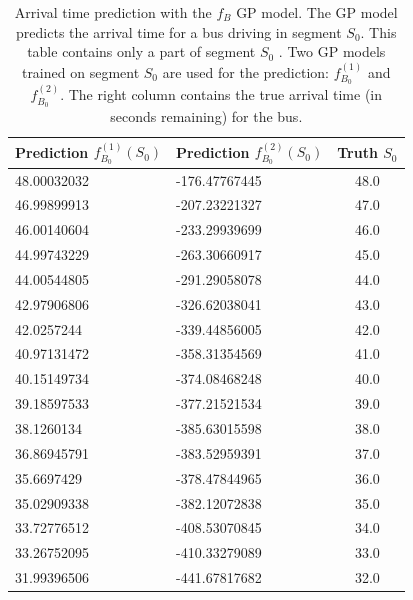 \begin{table}
    \centering
    \caption[Arrival time prediction with the $f_B$ GP model]%
    {{\small Arrival time prediction with the $f_B$ GP model.
    The GP model predicts the arrival time for a bus driving in segment $S_0$.
    This table contains only a part of segment $S_0$ .
    Two GP models trained on segment $S_0$ are used for the prediction: $f^{(1)}_{B_0}$ and $f^{(2)}_{B_0}$.
    The right column contains the true arrival time (in seconds remaining) for the bus.}}
    \label{table:f_B-examples} 
    \begin{tabular}{ |l|l|c| } 
        \hline
        Prediction $f^{(1)}_{B_0}(S_0)$ & Prediction $f^{(2)}_{B_0}(S_0)$ & Truth $S_0$ \\ [0.5ex] 
        \hline
        48.00032032 & -176.47767445 & 48.0 \\
        46.99899913 & -207.23221327 & 47.0 \\
        46.00140604 & -233.29939699 & 46.0 \\
        44.99743229 & -263.30660917 & 45.0 \\
        44.00544805 & -291.29058078 & 44.0 \\
        42.97906806 & -326.62038041 & 43.0 \\
        42.0257244 & -339.44856005 & 42.0 \\
        40.97131472 & -358.31354569 & 41.0 \\
        40.15149734 & -374.08468248 & 40.0 \\
        39.18597533 & -377.21521534 & 39.0 \\
        38.1260134 & -385.63015598 & 38.0 \\
        36.86945791 & -383.52959391 & 37.0 \\
        35.6697429 & -378.47844965 & 36.0 \\
        35.02909338 & -382.12072838 & 35.0 \\
        33.72776512 & -408.53070845 & 34.0 \\
        33.26752095 & -410.33279089 & 33.0 \\
        31.99396506 & -441.67817682 & 32.0 \\ 
        \hline
    \end{tabular}
\end{table}

